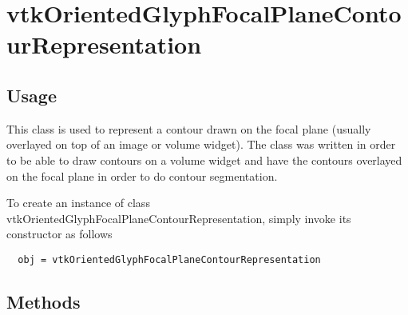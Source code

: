 \section{vtkOrientedGlyphFocalPlaneContourRepresentation}

\subsection{Usage}

 This class is used to represent a contour drawn on the focal plane (usually 
 overlayed on top of an image or volume widget).
 The class was written in order to be able to draw contours on a volume widget 
 and have the contours overlayed on the focal plane in order to do contour 
 segmentation.
 

To create an instance of class vtkOrientedGlyphFocalPlaneContourRepresentation, simply
invoke its constructor as follows
\begin{verbatim}
  obj = vtkOrientedGlyphFocalPlaneContourRepresentation
\end{verbatim}
\subsection{Methods}

